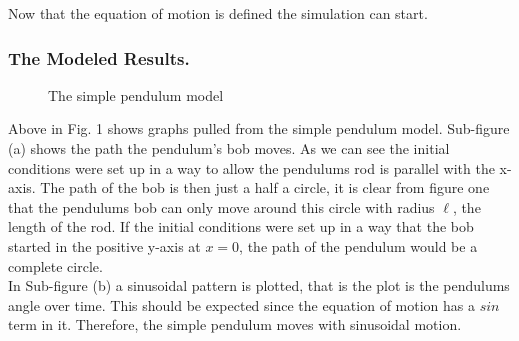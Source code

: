 \documentclass[runningheads]{llncs}
\begin{document}
Now that the equation of motion is defined the simulation can start.

\subsubsection{The Modeled Results.}

\begin{figure}%
    \centerinR
    \qquad
    \caption{The simple pendulum model}%
    \label{fig:example}%
\end{figure}

Above in Fig. 1 shows graphs pulled from the simple pendulum model. Sub-figure (a) shows the path the pendulum's bob moves. As we can see the initial conditions were set up in a way to allow the pendulums rod is parallel with the x-axis. The path of the bob is then just a half a circle, it is clear from figure one that the pendulums bob can only move around this circle with radius $\ell$, the length of the rod. If the initial conditions were set up in a way that the bob started in the positive y-axis at $x = 0$, the path of the pendulum would be a complete circle. \\

In Sub-figure (b) a sinusoidal pattern is plotted, that is the plot is the pendulums angle over time. This should be expected since the equation of motion has a $sin$ term in it. Therefore, the simple pendulum moves with sinusoidal motion. \\
\end{document}
